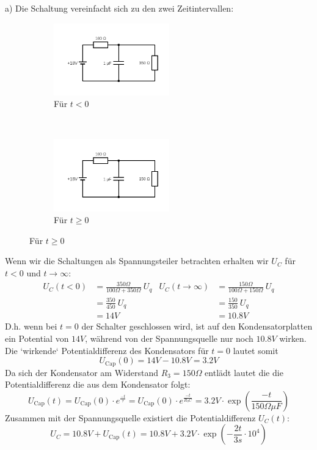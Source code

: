 \documentclass[11pt a4paper]{article}
\begin{document}
a) Die Schaltung vereinfacht sich zu den zwei Zeitintervallen:
\begin{figure}[H]
	\centering
	\begin{subfigure}[b]{0.3\textwidth}
		\includegraphics[width=5cm]{aufgabe5a_1.png}
		\caption{Für $t<0$}
	\end{subfigure}
	~
	\begin{subfigure}[b]{0.3\textwidth}
		\includegraphics[width=5cm]{aufgabe5a_2.png}
		\caption{Für $t\geq0$}
	\end{subfigure}
\end{figure}
Wenn wir die Schaltungen als Spannungsteiler betrachten erhalten wir $U_C$ 
für $t < 0$ und $t \rightarrow \infty$:
\begin{align*}
	U_C (t < 0) &= \frac{350 \Omega}{100 \Omega + 350 \Omega} \ U_q
	&
	U_C (t\rightarrow\infty) &= \frac{150\Omega}{100\Omega +
	150 \Omega} \ U_q\\
	&= \frac{350}{450} \ U_q & &= \frac{150}{350} \ U_q \\
	&= 14V & &=10.8V
\end{align*}
D.h. wenn bei $t=0$ der Schalter geschlossen wird, ist auf den 
Kondensatorplatten ein Potential von $14V$, während von der Spannungsquelle
nur noch $10.8V$ wirken.\\
Die `wirkende` Potentialdifferenz des Kondensators für $t=0$ lautet somit
\[ U_\text{Cap} (0) = 14V - 10.8V = 3.2V \]
Da sich der Kondensator am Widerstand $R_3 = 150\Omega$ entlädt lautet die
die Potentialdifferenz die aus dem Kondensator folgt:
\[
	U_\text{Cap} (t) = U_\text{Cap} (0) \cdot e^{\frac{-t}{\tau}}
	= U_\text{Cap} (0) \cdot e^{\frac{-t}{R_3 C}}
	= 3.2 V \cdot \exp\left(\frac{-t}{150\Omega \mu F}\right)
\]
Zusammen mit der Spannungsquelle existiert die Potentialdifferenz $U_C(t)$:
\[
	U_C = 10.8V + U_\text{Cap} (t) = 
	10.8V + 3.2 V \cdot  \exp\left( -\frac{2t}{3s} \cdot 10^4\right)
\]
\end{document}
